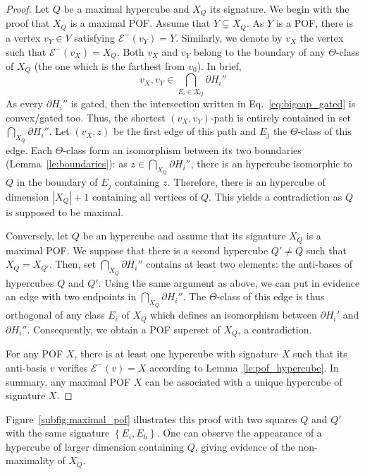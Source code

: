 \documentclass[a4paper,UKenglish,numberwithinsect,cleveref, autoref]{lipics-v2021}
\newcommand{\set}[1]{\left\{ #1 \right\}}
\newcommand{\card}[1]{\left| #1 \right|}
\begin{document}
\begin{proof}
Let $Q$ be a maximal hypercube and $X_Q$ its signature. We begin with the proof that $X_Q$ is a maximal POF. Assume that $Y \subsetneq X_Q$. As $Y$ is a POF, there is a vertex $v_Y \in V$ satisfying $\mathcal{E}^-(v_Y) = Y$. Similarly, we denote by $v_X$ the vertex such that $\mathcal{E}^-(v_X) = X_Q$. Both $v_X$ and $v_Y$ belong to the boundary of any $\Theta$-class of $X_Q$ (the one which is the farthest from $v_0$). In brief, 
\begin{equation}v_X,v_Y \in \bigcap_{E_i \in X_Q} \partial H_i''
\label{eq:bigcap_gated}
\end{equation}
As every $\partial H_i''$ is gated, then the intersection written in Eq.~\eqref{eq:bigcap_gated} is convex/gated too. Thus, the shortest $(v_X,v_Y)$-path is entirely contained in set $\bigcap_{X_Q} \partial H_i''$. Let $(v_X,z)$ be the first edge of this path and $E_j$ the $\Theta$-class of this edge. Each $\Theta$-class form an isomorphism between its two boundaries (Lemma~\ref{le:boundaries}): as $z \in \bigcap_{X_Q} \partial H_i''$, there is an hypercube isomorphic to $Q$ in the boundary of $E_j$ containing $z$. Therefore, there is an hypercube of dimension $\card{X_Q}+1$ containing all vertices of $Q$. This yields a contradiction as $Q$ is supposed to be maximal.

Conversely, let $Q$ be an hypercube and assume that its signature $X_Q$ is a maximal POF. We suppose that there is a second hypercube $Q' \neq Q$ such that $X_Q = X_{Q'}$. Then, set $\bigcap_{X_Q} \partial H_i''$ contains at least two elements: the anti-bases of hypercubes $Q$ and $Q'$. Using the same argument as above, we can put in evidence an edge with two endpoints in $\bigcap_{X_Q} \partial H_i''$. The $\Theta$-class of this edge is thus orthogonal of any class $E_i$ of $X_Q$ which defines an isomorphism between $\partial H_i'$ and $\partial H_i''$. Consequently, we obtain a POF superset of $X_Q$, a contradiction.

For any POF $X$, there is at least one hypercube with signature $X$ such that its anti-basis $v$ verifies $\mathcal{E}^-(v) = X$ according to Lemma~\ref{le:pof_hypercube}. In summary, any maximal POF $X$ can be associated with a unique hypercube of signature $X$.
\end{proof}

Figure~\ref{subfig:maximal_pof} illustrates this proof with two squares $Q$ and $Q'$ with the same signature $\set{E_i,E_h}$. One can observe the appearance of a hypercube of larger dimension containing $Q$, giving evidence of the non-maximality of $X_Q$.
\end{document}
